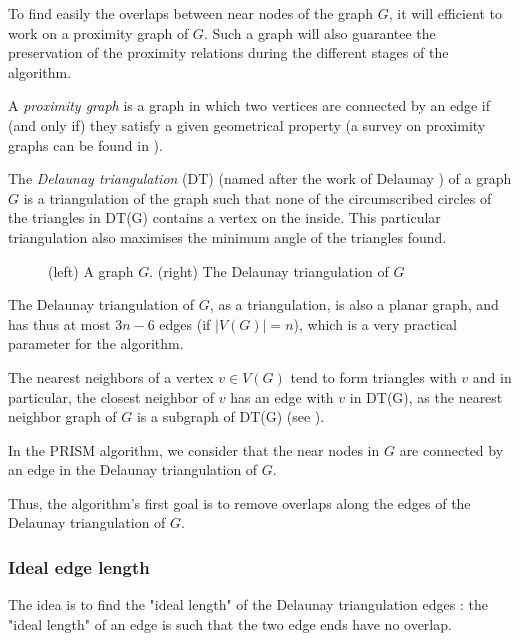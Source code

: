 \documentclass[12pt]{report}
\begin{document}
To find easily the overlaps between near nodes of the graph $G$, it will efficient to work on a proximity graph of $G$. Such a graph will also guarantee the preservation of the proximity relations during the different stages of the algorithm.

A \emph{proximity graph} is a graph in which two vertices are connected by an edge if (and only if) they satisfy a given geometrical property (a survey on proximity graphs can be found in \cite{JT92}).

\bigskip


The \emph{Delaunay triangulation} (DT) (named after the work of Delaunay \cite{Delaunay34}) of a graph $G$ is a triangulation of the graph such that none of the circumscribed circles of the triangles in DT(G) contains a vertex on the inside. This particular triangulation also maximises the minimum angle of the triangles found.

\begin{figure}[h]
	\center
  \setlength\fboxsep{5pt}
  \setlength\fboxrule{0.5pt}
  \caption{(left) A graph $G$. (right) The Delaunay triangulation of $G$}
  \label{DT}
\end{figure}

The Delaunay triangulation of $G$, as a triangulation, is also a planar graph, and has thus at most $3n -6$ edges (if $|V(G)| = n$), which is a very practical parameter for the algorithm.

\bigskip

The nearest neighbors of a vertex $v \in V(G)$ tend to form triangles with $v$ and in particular, the closest neighbor of $v$ has an edge with $v$ in DT(G), as the nearest neighbor graph of $G$ is a subgraph of DT(G) (see \cite{JT92}).

In the PRISM algorithm, we consider that the near nodes in $G$ are connected by an edge in the Delaunay triangulation of $G$.

Thus, the algorithm's first goal is to remove overlaps along the edges of the Delaunay triangulation of $G$.

\subsubsection{Ideal edge length}
The idea is to find the "ideal length" of the Delaunay triangulation edges : the "ideal length" of an edge is such that the two edge ends have no overlap.
\end{document}
